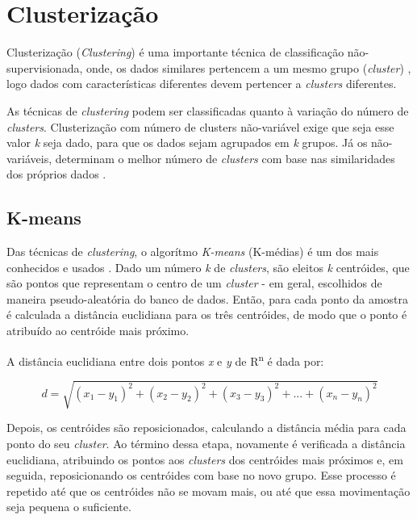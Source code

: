\section{Clusterização}
Clusterização ({\it Clustering}) é uma importante técnica de classificação
não-supervisionada, onde, os dados similares pertencem a um mesmo grupo 
({\it cluster}) \cite{ga_based_clustering_technique}, logo dados com 
características diferentes devem pertencer a {\it clusters} diferentes.

As técnicas de {\it clustering} podem ser classificadas quanto à variação
do número de {\it clusters}. Clusterização com número de clusters não-variável 
exige que seja esse valor {\it k} seja dado, para que os dados sejam agrupados 
em {\it k} grupos. Já os não-variáveis, determinam o melhor número de 
{\it clusters} com base nas similaridades dos próprios dados \cite{crisp}.

\subsection{K-means}
Das técnicas de {\it clustering}, o algorítmo {\it K-means} (K-médias) é um dos
mais conhecidos e usados \cite{ga_based_clustering_technique}. Dado um número
{\it k} de {\it clusters}, são eleitos {\it k} centróides, que são pontos que
representam o centro de um {\it cluster} - em geral, escolhidos de maneira 
pseudo-aleatória do banco de dados. Então, para cada ponto da amostra é calculada
a distância euclidiana para os três centróides, de modo que o ponto é atribuído 
ao centróide mais próximo. 

A distância euclidiana entre dois pontos {\it x} e {\it y} de R\textsuperscript{n} 
é dada por:

\begin{equation} d = \sqrt{(x_1-y_1)^2 + (x_2-y_2)^2 + (x_3-y_3)^2 + ... + (x_n-y_n)^2} \end{equation}

Depois, os centróides são reposicionados, calculando a distância média para cada 
ponto do seu {\it cluster}. Ao término dessa etapa, novamente é verificada a 
distância euclidiana, atribuindo os pontos aos {\it clusters} dos centróides mais
próximos e, em seguida, reposicionando os centróides com base no novo grupo. 
Esse processo é repetido até que os centróides não se movam mais, ou até que essa
movimentação seja pequena o suficiente.

